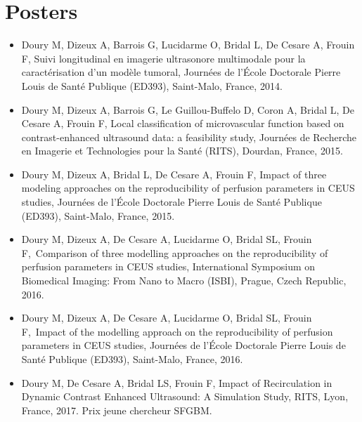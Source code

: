 \section*{Posters}
\begin{itemize}
\item Doury M, Dizeux A, Barrois G, Lucidarme O, Bridal L, De Cesare A, Frouin F, Suivi longitudinal en imagerie ultrasonore multimodale pour la caract\'erisation d’un mod\`ele tumoral, Journ\'ees de l’\'Ecole Doctorale Pierre Louis de Sant\'e Publique (ED393), Saint-Malo, France, 2014.
\item Doury M, Dizeux A, Barrois G, Le Guillou-Buffelo D, Coron A, Bridal L, De Cesare A, Frouin F, Local classification of microvascular function based on contrast-enhanced ultrasound data: a feasibility study, Journ\'ees de Recherche en Imagerie et Technologies pour la Sant\'e (RITS), Dourdan, France, 2015.
\item Doury M, Dizeux A, Bridal L, De Cesare A, Frouin F, Impact of three modeling approaches on the reproducibility of perfusion parameters in CEUS studies, Journ\'ees de l’\'Ecole Doctorale Pierre Louis de Sant\'e Publique (ED393), Saint-Malo, France, 2015.
\item Doury M, Dizeux A, De Cesare A, Lucidarme O, Bridal SL, Frouin F, Comparison of three modelling approaches on the reproducibility of perfusion parameters in CEUS studies, International Symposium on Biomedical Imaging: From Nano to Macro (ISBI), Prague, Czech Republic, 2016.
\item Doury M, Dizeux A, De Cesare A, Lucidarme O, Bridal SL, Frouin F, Impact of the modelling approach on the reproducibility of perfusion parameters in CEUS studies, Journ\'ees de l’\'Ecole Doctorale Pierre Louis de Sant\'e Publique (ED393), Saint-Malo, France, 2016.
\item Doury M, De Cesare A, Bridal LS, Frouin F, Impact of Recirculation in Dynamic Contrast Enhanced Ultrasound: A Simulation Study, RITS, Lyon, France, 2017. Prix jeune chercheur SFGBM.
\end{itemize}
